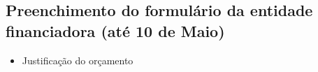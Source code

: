 \documentclass[%
	nofootinbib,
	amsmath,amssymb,
	aps,
	12pt,
	a4paper
]{article}
\begin{document}
\subsection{Preenchimento do formulário da entidade financiadora (até 10 de Maio)}
\begin{itemize}
	\item Justificação do orçamento
\end{itemize}




\end{document}
